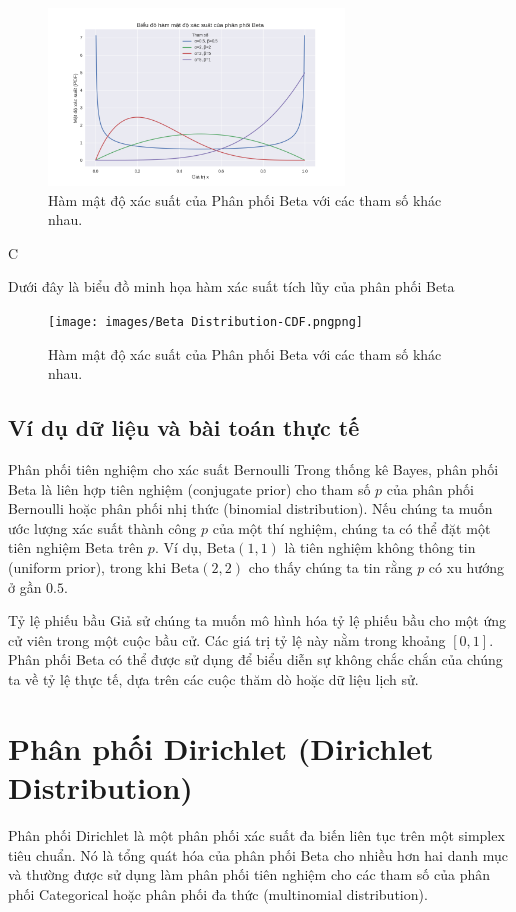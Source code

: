 	\begin{figure}[h!]
		\centering
		\includegraphics[width=0.7\textwidth]{images/Beta Distribution-PDF.png} %
		\caption{Hàm mật độ xác suất của Phân phối Beta với các tham số khác nhau.}
		\label{fig:Beta Distribution-PDF}
	\end{figure}C
	
	Dưới đây là biểu đồ minh họa hàm xác suất tích lũy của phân phối Beta
	
		\begin{figure}[h!]
		\centering
		\texttt{[image: images/Beta Distribution-CDF.pngpng]} %
		\caption{Hàm mật độ xác suất của Phân phối Beta với các tham số khác nhau.}
		\label{fig:Beta Distribution-CDF}
	\end{figure}
	
	\subsection{Ví dụ dữ liệu và bài toán thực tế}
		Phân phối tiên nghiệm cho xác suất Bernoulli
		Trong thống kê Bayes, phân phối Beta là liên hợp tiên nghiệm (conjugate prior) cho tham số $p$ của phân phối Bernoulli hoặc phân phối nhị thức (binomial distribution). Nếu chúng ta muốn ước lượng xác suất thành công $p$ của một thí nghiệm, chúng ta có thể đặt một tiên nghiệm Beta trên $p$. Ví dụ, $\text{Beta}(1,1)$ là tiên nghiệm không thông tin (uniform prior), trong khi $\text{Beta}(2,2)$ cho thấy chúng ta tin rằng $p$ có xu hướng ở gần $0.5$.
	
		Tỷ lệ phiếu bầu
		Giả sử chúng ta muốn mô hình hóa tỷ lệ phiếu bầu cho một ứng cử viên trong một cuộc bầu cử. Các giá trị tỷ lệ này nằm trong khoảng $[0, 1]$. Phân phối Beta có thể được sử dụng để biểu diễn sự không chắc chắn của chúng ta về tỷ lệ thực tế, dựa trên các cuộc thăm dò hoặc dữ liệu lịch sử.
	
\section{Phân phối Dirichlet (Dirichlet Distribution)}
	Phân phối Dirichlet là một phân phối xác suất đa biến liên tục trên một simplex tiêu chuẩn. Nó là tổng quát hóa của phân phối Beta cho nhiều hơn hai danh mục và thường được sử dụng làm phân phối tiên nghiệm cho các tham số của phân phối Categorical hoặc phân phối đa thức (multinomial distribution).
	
